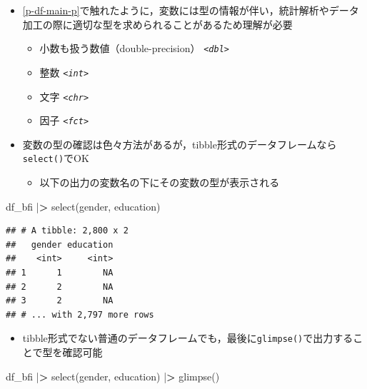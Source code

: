 \documentclass[
  xelatex,ja=standard, b5paper]{bxjsbook}
\newenvironment{Shaded}{\begin{snugshade}}{\end{snugshade}}
\newcommand{\ErrorTok}[1]{\textcolor[rgb]{0.64,0.00,0.00}{\textbf{#1}}}
\newcommand{\FunctionTok}[1]{\textcolor[rgb]{0.00,0.00,0.00}{#1}}
\newcommand{\NormalTok}[1]{#1}
\newcommand{\SpecialCharTok}[1]{\textcolor[rgb]{0.00,0.00,0.00}{#1}}
\providecommand{\tightlist}{%
  \setlength{\itemsep}{0pt}\setlength{\parskip}{0pt}}
\begin{document}
\begin{itemize}
\tightlist
\item
  \ref{p-df-main-p}で触れたように，変数には型の情報が伴い，統計解析やデータ加工の際に適切な型を求められることがあるため理解が必要

  \begin{itemize}
  \tightlist
  \item
    小数も扱う数値（double-precision） \emph{\texttt{\textless{}dbl\textgreater{}}}
  \item
    整数 \emph{\texttt{\textless{}int\textgreater{}}}
  \item
    文字 \emph{\texttt{\textless{}chr\textgreater{}}}
  \item
    因子 \emph{\texttt{\textless{}fct\textgreater{}}}
  \end{itemize}
\item
  変数の型の確認は色々方法があるが，tibble形式のデータフレームなら\texttt{select()}でOK

  \begin{itemize}
  \tightlist
  \item
    以下の出力の変数名の下にその変数の型が表示される
  \end{itemize}
\end{itemize}

\begin{Shaded}
\begin{Highlighting}[]
\NormalTok{df\_bfi }\SpecialCharTok{|}\ErrorTok{\textgreater{}} 
  \FunctionTok{select}\NormalTok{(gender, education)}
\end{Highlighting}
\end{Shaded}

\begin{verbatim}
## # A tibble: 2,800 x 2
##   gender education
##    <int>     <int>
## 1      1        NA
## 2      2        NA
## 3      2        NA
## # ... with 2,797 more rows
\end{verbatim}

\begin{itemize}
\tightlist
\item
  tibble形式でない普通のデータフレームでも，最後に\texttt{glimpse()}で出力することで型を確認可能
\end{itemize}

\begin{Shaded}
\begin{Highlighting}[]
\NormalTok{df\_bfi }\SpecialCharTok{|}\ErrorTok{\textgreater{}}
  \FunctionTok{select}\NormalTok{(gender, education) }\SpecialCharTok{|}\ErrorTok{\textgreater{}}
  \FunctionTok{glimpse}\NormalTok{()}
\end{Highlighting}
\end{Shaded}
\end{document}
